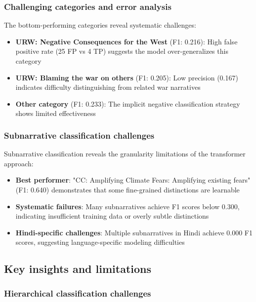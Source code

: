 \subsubsection{Challenging categories and error analysis}

The bottom-performing categories reveal systematic challenges:

\begin{itemize}
    \item \textbf{URW: Negative Consequences for the West} (F1: 0.216): High false positive rate (25 FP vs 4 TP) suggests the model over-generalizes this category
    \item \textbf{URW: Blaming the war on others} (F1: 0.205): Low precision (0.167) indicates difficulty distinguishing from related war narratives
    \item \textbf{Other category} (F1: 0.233): The implicit negative classification strategy shows limited effectiveness
\end{itemize}

\subsubsection{Subnarrative classification challenges}

Subnarrative classification reveals the granularity limitations of the transformer approach:

\begin{itemize}
    \item \textbf{Best performer}: "CC: Amplifying Climate Fears: Amplifying existing fears" (F1: 0.640) demonstrates that some fine-grained distinctions are learnable
    \item \textbf{Systematic failures}: Many subnarratives achieve F1 scores below 0.300, indicating insufficient training data or overly subtle distinctions
    \item \textbf{Hindi-specific challenges}: Multiple subnarratives in Hindi achieve 0.000 F1 scores, suggesting language-specific modeling difficulties
\end{itemize}

\subsection{Key insights and limitations}

\subsubsection{Hierarchical classification challenges}

